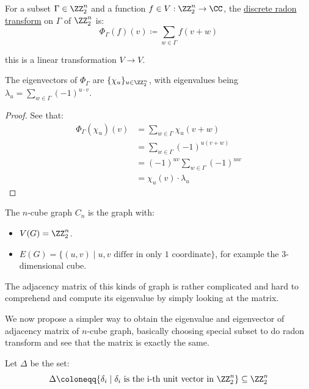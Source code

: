 \begin{definition}
	For a subset \( \Gamma \in \ZZ_2^n \) and a function \( f\in V: \ZZ^n_2 \to \CC \), the \underline{discrete radon transform} on \( \Gamma \) of \( \ZZ^n_2 \) is:
	\[
		\Phi_{\Gamma} (f) (v) \coloneqq  \sum_{w\in \Gamma}f(v+w)
	\]

	this is a linear transformation \( V\to V \).
\end{definition}

\begin{theorem}
	The eigenvectors of \( \Phi_\Gamma \) are \( \{\chi_u\}_{u\in \ZZ_2^n} \), with eigenvalues being \( \lambda_u = \sum_{w\in \Gamma} (-1)^{u\cdot v} \).
\end{theorem}

\begin{proof}
	See that:
	\[
		\begin{aligned}
			\Phi_\Gamma(\chi_u)(v) & = \sum_{w\in \Gamma}\chi_u(v+w)         \\
			                       & = \sum_{w\in \Gamma }(-1)^{u(v+w)}      \\
			                       & = (-1)^{uv}\sum_{w\in \Gamma }(-1)^{uw} \\
			                       & = \chi_u(v) \cdot \lambda_u
		\end{aligned}
	\]
\end{proof}

\begin{definition}
	The \( n \)-cube graph \( C_n \) is the graph with:
	\begin{itemize}
		\item \( V(G) = \ZZ_2^n \).
		\item \( E(G) = \{(u,v) \; | \; u,v \text{ differ in only 1 coordinate}\} \), for example the 3-dimensional cube.
	\end{itemize}

	The adjacency matrix of this kinds of graph is rather complicated and hard to comprehend and compute its eigenvalue by simply looking at the matrix.
\end{definition}

We now propose a simpler way to obtain the eigenvalue and eigenvector of adjacency matrix of \( n \)-cube graph, basically choosing special subset to do radon transform and see that the matrix is exactly the same.

Let \( \Delta \) be the set:
\[
	\Delta \coloneqq  \{\delta_i \; | \; \delta_i \text{ is the i-th unit vector in } \ZZ^n_2\} \subseteq \ZZ^n_2
\]

